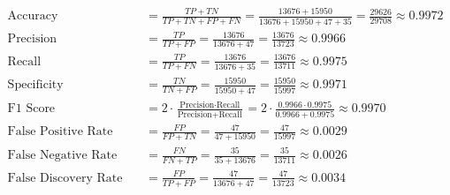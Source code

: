 \begin{align*}
\text{Accuracy} &= \frac{TP + TN}{TP + TN + FP + FN} = \frac{13676 + 15950}{13676 + 15950 + 47 + 35} = \frac{29626}{29708} \approx 0.9972 \\
\text{Precision} &= \frac{TP}{TP + FP} = \frac{13676}{13676 + 47} = \frac{13676}{13723} \approx 0.9966 \\
\text{Recall} &= \frac{TP}{TP + FN} = \frac{13676}{13676 + 35} = \frac{13676}{13711} \approx 0.9975 \\
\text{Specificity} &= \frac{TN}{TN + FP} = \frac{15950}{15950 + 47} = \frac{15950}{15997} \approx 0.9971 \\
\text{F1 Score} &= 2 \cdot \frac{\text{Precision} \cdot \text{Recall}}{\text{Precision} + \text{Recall}} = 2 \cdot \frac{0.9966 \cdot 0.9975}{0.9966 + 0.9975} \approx 0.9970 \\
\text{False Positive Rate (FPR)} &= \frac{FP}{FP + TN} = \frac{47}{47 + 15950} = \frac{47}{15997} \approx 0.0029 \\
\text{False Negative Rate (FNR)} &= \frac{FN}{FN + TP} = \frac{35}{35 + 13676} = \frac{35}{13711} \approx 0.0026 \\
\text{False Discovery Rate (FDR)} &= \frac{FP}{TP + FP} = \frac{47}{13676 + 47} = \frac{47}{13723} \approx 0.0034 \\
\end{align*}
